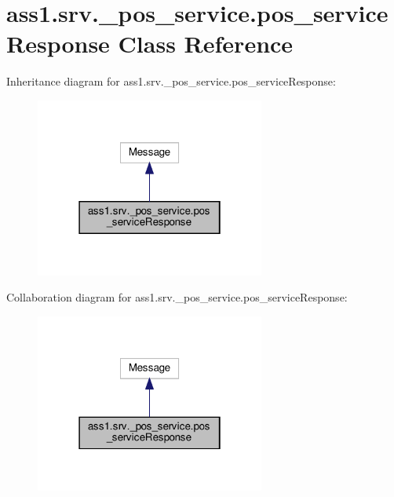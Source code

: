 \hypertarget{classass1_1_1srv_1_1__pos__service_1_1pos__serviceResponse}{}\section{ass1.\+srv.\+\_\+pos\+\_\+service.\+pos\+\_\+service\+Response Class Reference}
\label{classass1_1_1srv_1_1__pos__service_1_1pos__serviceResponse}


Inheritance diagram for ass1.\+srv.\+\_\+pos\+\_\+service.\+pos\+\_\+service\+Response\+:
\nopagebreak
\begin{figure}[H]
\begin{center}
\leavevmode
\includegraphics[width=214pt]{classass1_1_1srv_1_1__pos__service_1_1pos__serviceResponse__inherit__graph}
\end{center}
\end{figure}


Collaboration diagram for ass1.\+srv.\+\_\+pos\+\_\+service.\+pos\+\_\+service\+Response\+:
\nopagebreak
\begin{figure}[H]
\begin{center}
\leavevmode
\includegraphics[width=214pt]{classass1_1_1srv_1_1__pos__service_1_1pos__serviceResponse__coll__graph}
\end{center}
\end{figure}
